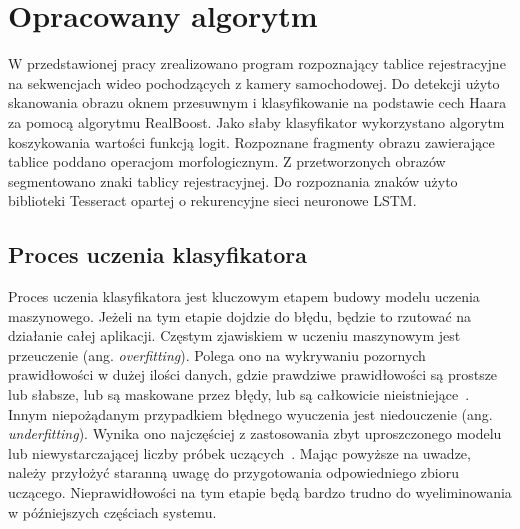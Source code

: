
\chapter{Opracowany algorytm}
\label{ch:opracowany-algorytm}
W przedstawionej pracy zrealizowano program rozpoznający tablice rejestracyjne na sekwencjach wideo pochodzących z kamery samochodowej.
Do detekcji użyto skanowania obrazu oknem przesuwnym i klasyfikowanie na podstawie cech Haara za pomocą algorytmu RealBoost.
Jako słaby klasyfikator wykorzystano algorytm koszykowania wartości funkcją logit.
Rozpoznane fragmenty obrazu zawierające tablice poddano operacjom morfologicznym.
Z przetworzonych obrazów segmentowano znaki tablicy rejestracyjnej.
Do rozpoznania znaków użyto biblioteki Tesseract opartej o rekurencyjne sieci neuronowe LSTM\@.


\section{Proces uczenia klasyfikatora}
\label{sec:proces-uczenia-klasyfikatora}
Proces uczenia klasyfikatora jest kluczowym etapem budowy modelu uczenia maszynowego.
Jeżeli na tym etapie dojdzie do błędu, będzie to rzutować na działanie całej aplikacji.
Częstym zjawiskiem w uczeniu maszynowym jest przeuczenie (ang. \textit{overfitting}).
Polega ono na wykrywaniu pozornych prawidłowości w dużej ilości danych, gdzie prawdziwe prawidłowości są prostsze lub słabsze, lub są maskowane przez błędy, lub są całkowicie nieistniejące~\cite{overfitting}.
Innym niepożądanym przypadkiem błędnego wyuczenia jest niedouczenie (ang. \textit{underfitting}).
Wynika ono najczęściej z zastosowania zbyt uproszczonego modelu lub niewystarczającej liczby próbek uczących~\cite{overfitting}.
Mając powyższe na uwadze, należy przyłożyć staranną uwagę do przygotowania odpowiedniego zbioru uczącego.
Nieprawidłowości na tym etapie będą bardzo trudno do wyeliminowania w późniejszych częściach systemu.

